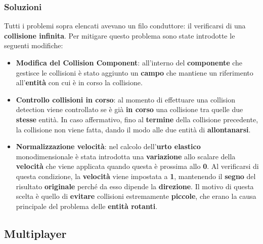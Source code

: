 \subsubsection{Soluzioni}
Tutti i problemi sopra elencati avevano un filo conduttore: il verificarsi di una \textbf{collisione infinita}. Per mitigare questo problema sono state introdotte le seguenti modifiche:
\begin{itemize}
    \item \textbf{Modifica del Collision Component}: all'interno del \textbf{componente} che gestisce le collisioni è stato aggiunto un \textbf{campo} che mantiene un riferimento all'\textbf{entità} con cui è in corso la collisione.

    \item \textbf{Controllo collisioni in corso}: al momento di effettuare una collision detection\textbf{} viene controllato se è già \textbf{in corso} una collisione tra quelle due \textbf{stesse} entità. In caso affermativo, fino al \textbf{termine} della collisione precedente, la collisione non viene fatta, dando il modo alle due entità di \textbf{allontanarsi}.
    
    \item \textbf{Normalizzazione velocità}: nel calcolo dell'\textbf{urto elastico} monodimensionale è stata introdotta una \textbf{variazione} allo scalare della \textbf{velocità} che viene applicata quando questa è prossima allo \textbf{0}. Al verificarsi di questa condizione, la \textbf{velocità} viene impostata a \textbf{1}, mantenendo il \textbf{segno} del risultato \textbf{originale} perché da esso dipende la \textbf{direzione}. Il motivo di questa scelta è quello di \textbf{evitare} collisioni estremamente \textbf{piccole}, che erano la causa principale del problema delle \textbf{entità rotanti}.
\end{itemize}

\subsection{Multiplayer}





